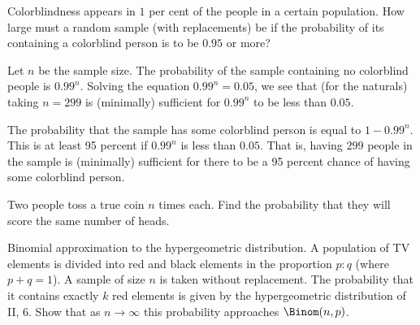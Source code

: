 \begin{problem}[Handout 8, \# 14]
  Colorblindness appears in \(1\) per cent of the people in a certain
  population. How large must a random sample (with replacements) be if the
  probability of its containing a colorblind person is to be \(0.95\) or more?
\end{problem}
\begin{solution}
Let $n$ be the sample size. The probability of the sample containing no colorblind people is $0.99^n$. Solving the equation $0.99^n=0.05$, we see that (for the naturals) taking $n = 299$ is (minimally) sufficient for $0.99^n$ to be less than $0.05$.

The probability that the sample has some colorblind person is equal to $1-0.99^n$. This is at least 95 percent if $0.99^n$ is less than $0.05$. That is, having $299$ people in the sample is (minimally) sufficient for there to be a 95 percent chance of having some colorblind person.
\end{solution}
\newpage

\begin{problem}[Handout 8, \# 15]
  Two people toss a true coin \(n\) times each. Find the probability that
  they will score the same number of heads.
\end{problem}
\begin{solution}

\end{solution}
\newpage

\begin{problem}[Handout 8, \# 16]
  Binomial approximation to the hypergeometric distribution. A population
  of TV elements is divided into red and black elements in the proportion
  \(p:q\) (where \(p+q=1\)). A sample of size \(n\) is taken without
  replacement. The probability that it contains exactly \(k\) red elements
  is given by the hypergeometric distribution of II, 6. Show that as
  \(n\to\infty\) this probability approaches \(\Binom(n,p)\).
\end{problem}
\begin{solution}

\end{solution}
\newpage

